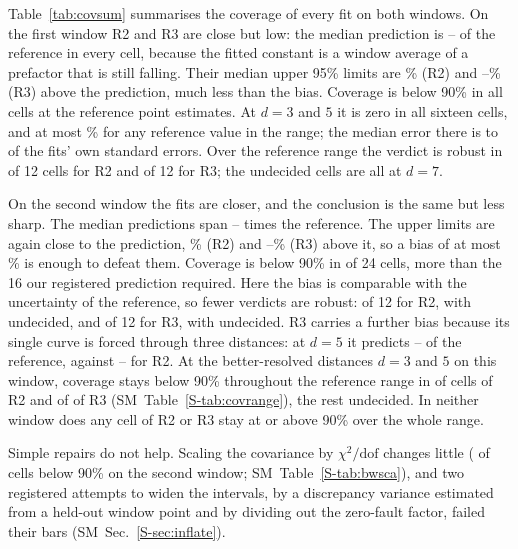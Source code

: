 \documentclass[aps,pre,twocolumn,superscriptaddress,nofootinbib,10pt]{revtex4-2}
\newcommand{\SM}{SM}
\begin{document}
Table~\ref{tab:covsum} summarises the coverage of every fit on both windows. On the first window R2 and R3 are close but low: the median prediction is -- of the reference in every cell, because the fitted constant is a window average of a prefactor that is still falling. Their median upper 95\% limits are \% (R2) and --\% (R3) above the prediction, much less than the bias. Coverage is below 90\% in all  cells at the reference point estimates. At $d=3$ and $5$ it is zero in all sixteen cells, and at most \% for any reference value in the range; the median error there is  to  of the fits' own standard errors. Over the reference range the verdict is robust in  of 12 cells for R2 and  of 12 for R3; the undecided cells are all at $d=7$.

On the second window the fits are closer, and the conclusion is the same but less sharp. The median predictions span -- times the reference. The upper limits are again close to the prediction, \% (R2) and --\% (R3) above it, so a bias of at most \% is enough to defeat them. Coverage is below 90\% in  of 24 cells, more than the 16 our registered prediction required. Here the bias is comparable with the uncertainty of the reference, so fewer verdicts are robust:  of 12 for R2, with  undecided, and  of 12 for R3, with  undecided. R3 carries a further bias because its single curve is forced through three distances: at $d=5$ it predicts -- of the reference, against -- for R2. At the better-resolved distances $d=3$ and $5$ on this window, coverage stays below 90\% throughout the reference range in  of  cells of R2 and  of  of R3 (\SM\ Table~\ref{S-tab:covrange}), the rest undecided. In neither window does any cell of R2 or R3 stay at or above 90\% over the whole range.

Simple repairs do not help. Scaling the covariance by $\chi^2/\mathrm{dof}$ changes little ( of  cells below 90\% on the second window; \SM\ Table~\ref{S-tab:bwsca}), and two registered attempts to widen the intervals, by a discrepancy variance estimated from a held-out window point and by dividing out the zero-fault factor, failed their bars (\SM\ Sec.~\ref{S-sec:inflate}).
\end{document}
